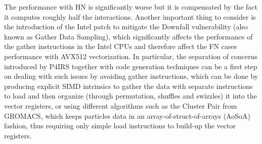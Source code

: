 \documentclass[Afour,sageh,times]{sagej}
\begin{document}
The performance with \ac{HN} is significantly worse but it is compensated by the fact it computes roughly half the interactions.
Another important thing to consider is the introduction of the Intel patch to mitigate the Downfall vulnerability (also known as Gather Data Sampling), which significantly affects the performance of the gather instructions in the Intel CPUs and therefore affect the \ac{FN} cases performance with AVX512 vectorization.
In particular, the separation of concerns introduced by P4IRS together with code generation techniques can be a first step on dealing with such issues by avoiding gather instructions, which can be done by producing explicit SIMD intrinsics to gather the data with separate instructions to load and then organize (through permutation, shuffles and swizzles) it into the vector registers, or using different algorithms such as the Cluster Pair from GROMACS, which keeps particles data in an array-of-struct-of-arrays (AoSoA) fashion, thus requiring only simple load instructions to build-up the vector registers.

\end{document}
